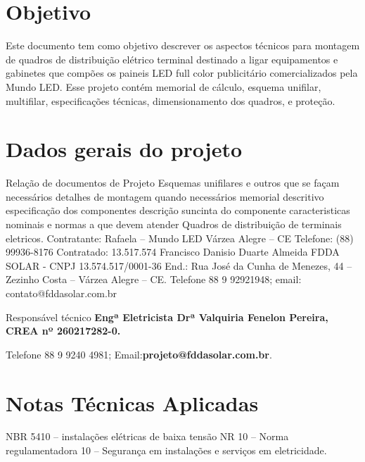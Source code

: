 \section{Objetivo}

Este documento tem como objetivo descrever os aspectos técnicos para montagem de quadros  de distribuição elétrico terminal destinado a ligar equipamentos e gabinetes que compões os paineis LED full color publicitário comercializados pela Mundo LED. 
Esse projeto  contém memorial de cálculo, esquema unifilar, multifilar, especificações técnicas, dimensionamento dos quadros, e proteção.

\section{Dados gerais do projeto}

Relação de documentos de Projeto
Esquemas unifilares e outros que se façam necessários
detalhes de montagem quando necessários
memorial descritivo
especificação dos componentes descrição suncinta do componente caracteristicas nominais e normas a que devem atender
Quadros de distribuição de terminais eletricos. 
Contratante: Rafaela – Mundo LED
Várzea Alegre – CE
Telefone: (88) 99936-8176
Contratado: 13.517.574 Francisco Danisio Duarte Almeida 
FDDA SOLAR - CNPJ 13.574.517/0001-36
End.: Rua José da Cunha de Menezes, 44  – Zezinho Costa – Várzea Alegre – CE. 
Telefone 88 9 92921948; email: contato@fddasolar.com.br

Responsável técnico\textbf{ Engª Eletricista Drª Valquiria Fenelon Pereira,}  
\textbf{CREA nº 260217282-0.}  

Telefone 88 9 9240 4981; Email:\textbf{projeto@fddasolar.com.br}. 


\section{Notas Técnicas Aplicadas}
NBR 5410 – instalações elétricas de baixa tensão
NR 10 – Norma regulamentadora 10 – Segurança em instalações e serviços em eletricidade.